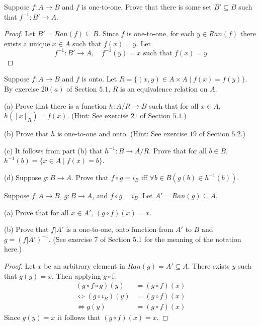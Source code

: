 \begin{tcolorbox}[title=Problem 12, breakable]
    Suppose $f : A \rightarrow B$ and $f$ is one-to-one.
    Prove that there is some set $B' \subseteq B$ 
        such that $f^{-1} : B' \rightarrow A$.
\end{tcolorbox}

\begin{proof}
    Let $B' = Ran(f) \subseteq B$.
    Since $f$ is one-to-one, for each $y \in Ran(f)$ there exists a unique $x \in A$
        such that $f(x) = y$.
    Let 
    \[
        f^{-1} : B' \rightarrow A, \quad f^{-1}(y) = x \text{ such that } f(x) = y
    \]
\end{proof}

\begin{tcolorbox}[title=Problem 13, breakable]
    Suppose $f : A \rightarrow B$ and $f$ is onto.
    Let $R = \{(x, y) \in A \times A \mid f(x) = f(y)\}$.
    By exercise $20(a)$ of Section $5.1$, $R$ is an equivalence
        relation on $A$.

    (a) Prove that there is a function $h : A / R \rightarrow B$ such that 
        for all $x \in A$, $h([x]_R) = f(x)$.
        (Hint: See exercise $21$ of Section $5.1.$)

    (b) Prove that $h$ is one-to-one and onto. (Hint: See exercise $19$ of 
        Section $5.2.$)

    (c) It follows from part (b) that $h^{-1} : B \rightarrow A / R$.
        Prove that for all $b \in B$, $h^{-1}(b) = \{x \in A \mid f(x) = b\}$.

    (d) Suppose $g : B \rightarrow A$. Prove that $f \circ g = i_B$
        iff $\forall{b} \in B(g(b) \in h^{-1}(b))$.
\end{tcolorbox}

\begin{tcolorbox}[title=Problem 14, breakable]
    Suppose $f : A \rightarrow B$, $g : B \rightarrow A$, and $f \circ g = i_B$.
    Let $A' = Ran(g) \subseteq A$.

    (a) Prove that for all $x \in A'$, $(g \circ f)(x) = x$.

    (b) Prove that $f | A'$ is a one-to-one, onto function from $A'$ to $B$
        and $g = (f | A')^{-1}$. (See exercise $7$ of Section $5.1$ for the 
        meaning of the notation here.)
\end{tcolorbox}

\begin{proof}
    Let $x$ be an arbitrary element in $Ran(g) = A' \subseteq A$.
    There exists $y$ such that $g(y) = x$.
    Then applying $g \circ $f:
    \begin{align*}
        (g \circ f \circ g)(y) &= (g \circ f)(x) \\
        \iff (g \circ i_B)(y) &= (g \circ f)(x) \\
        \iff g(y) &= (g \circ f)(x)
    \end{align*}
    Since $g(y) = x$ it follows that $(g \circ f)(x) = x$.
\end{proof}

